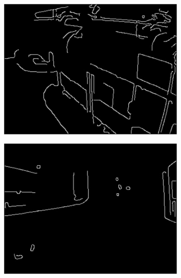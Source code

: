 \begin{figure}
\begin{subfigure}{0.49\columnwidth}
    \includegraphics[width=1.00\textwidth]{media/V_E_highsnrhighcanny.jpg}
    	\caption{}
		\label{fig:edgeprocessing_7}
  \end{subfigure}
	\begin{subfigure}{0.49\columnwidth}
    \centering
    \includegraphics[width=1.00\textwidth]{media/V_E_lowsnrhighcanny.jpg}
		\caption{}
		\label{fig:edgeprocessing_8}
  \end{subfigure}  \vspace{10pt} \\  
  	\begin{subfigure}{0.49\columnwidth}
      \centering

\end{subfigure}
\end{figure}
